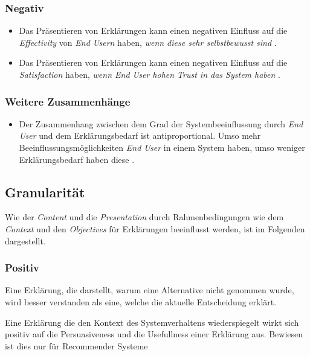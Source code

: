 \subsubsection*{Negativ}

\begin{itemize}
    \item Das Präsentieren von Erklärungen kann einen negativen Einfluss auf die \textit{Effectivity} von \textit{End Usern} haben, \textit{wenn diese sehr selbstbewusst sind} \cite{schaffer_i_2019}.
    \item Das Präsentieren von Erklärungen kann einen negativen Einfluss auf die \textit{Satisfaction} haben, \textit{wenn End User hohen Trust in das System haben} \cite{rosenfeld_explainability_2019, doshi2017towards}.
\end{itemize}

\subsubsection*{Weitere Zusammenhänge}

\begin{itemize}
    \item Der Zusammenhang zwischen dem Grad der Systembeeinflussung durch \textit{End User} und dem Erklärungsbedarf ist antiproportional. Umso mehr Beeinflussungsmöglichkeiten \textit{End User} in einem System haben, umso weniger Erklärungsbedarf haben diese \cite{rosenfeld_explainability_2019}.
\end{itemize}

\newpage

\subsection*{Granularität}

Wie der \textit{Content} und die \textit{Presentation} durch Rahmenbedingungen wie dem \textit{Context} und den \textit{Objectives} für Erklärungen beeinflusst werden, ist im Folgenden dargestellt.

\subsubsection*{Positiv}

Eine Erklärung, die darstellt, warum eine Alternative nicht genommen wurde, wird besser verstanden als eine, welche die aktuelle Entscheidung erklärt. \cite{schrills_color_2020}

Eine Erklärung die den Kontext des Systemverhaltens wiederspiegelt wirkt sich positiv auf die Persuasiveness und die Usefullness einer Erklärung aus. Bewiesen ist dies nur für Recommender Systeme \cite{sato_action-triggering_2019, abdulrahman_belief-based_2019}

